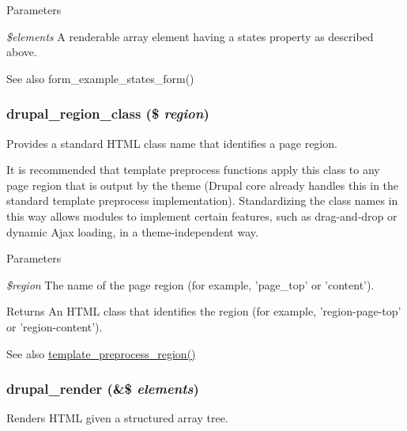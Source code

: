 \begin{DoxyParams}{Parameters}
\item[{\em \$elements}]A renderable array element having a states property as described above.\end{DoxyParams}
\begin{DoxySeeAlso}{See also}
form\_\-example\_\-states\_\-form() 
\end{DoxySeeAlso}
\hypertarget{common_8inc_a601489210268565d75adb9af61643e6c}{
\subsubsection[{drupal\_\-region\_\-class}]{\setlength{\rightskip}{0pt plus 5cm}drupal\_\-region\_\-class (\$ {\em region})}}
\label{common_8inc_a601489210268565d75adb9af61643e6c}
Provides a standard HTML class name that identifies a page region.

It is recommended that template preprocess functions apply this class to any page region that is output by the theme (Drupal core already handles this in the standard template preprocess implementation). Standardizing the class names in this way allows modules to implement certain features, such as drag-\/and-\/drop or dynamic Ajax loading, in a theme-\/independent way.


\begin{DoxyParams}{Parameters}
\item[{\em \$region}]The name of the page region (for example, 'page\_\-top' or 'content').\end{DoxyParams}
\begin{DoxyReturn}{Returns}
An HTML class that identifies the region (for example, 'region-\/page-\/top' or 'region-\/content').
\end{DoxyReturn}
\begin{DoxySeeAlso}{See also}
\hyperlink{includes_2theme_8inc_a587933392ed2e45a220b08c5708ecaab}{template\_\-preprocess\_\-region()} 
\end{DoxySeeAlso}
\hypertarget{common_8inc_a05798b44e8d6c496d4bee5cc32fa7851}{
\subsubsection[{drupal\_\-render}]{\setlength{\rightskip}{0pt plus 5cm}drupal\_\-render (\&\$ {\em elements})}}
\label{common_8inc_a05798b44e8d6c496d4bee5cc32fa7851}
Renders HTML given a structured array tree.

